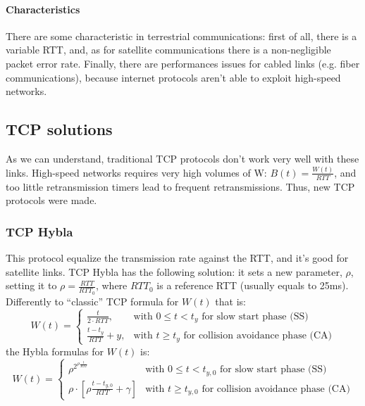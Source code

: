 \paragraph*{Characteristics} There are some characteristic in terrestrial
communications: first of all, there is a variable RTT, and, as for satellite
communications there is a non-negligible packet error rate. Finally, there are
performances issues for cabled links (e.g. fiber communications), because
internet protocols aren't able to exploit high-speed networks.

\subsection{TCP solutions}

As we can understand, traditional TCP protocols don't work very well with these
links. High-speed networks requires very high volumes of W:
$B(t) = \frac{W(t)}{RTT}$, and too little retransmission timers lead to frequent
retransmissions. Thus, new TCP protocols were made.

\subsubsection{TCP Hybla}
\label{prt:tcp:hybla}

This protocol equalize the transmission rate against the RTT, and it's good for
satellite links.
TCP Hybla has the following solution: it sets a new parameter, $\rho$, setting
it to $\rho = \frac{RTT}{RTT_0}$, where $RTT_0$ is a reference RTT (usually
equals to 25ms).
Differently to ``classic'' TCP formula for $W(t)$ that is:
\begin{equation*}
  W(t) = \begin{cases}
    \frac{t}{2 \cdot RTT}, & \mbox{with } 0 \le t < t_y \mbox{ for slow start phase (SS)} \\
    \frac{t - t_y}{RTT} + y, & \mbox{with } t \ge t_y \mbox{ for collision avoidance phase (CA)}
  \end{cases}
\end{equation*}
the Hybla formulas for $W(t)$ is:
\begin{equation}
  W(t) = \begin{cases}
    \rho^{2^{\rho \frac{t}{RTT}}} & \mbox{with } 0 \le t < t_{y,0} \mbox{ for slow start phase (SS)} \\
    \rho \cdot \left [\rho\frac{t - t_{y,0}}{RTT} + \gamma \right ] & \mbox{with } t \ge t_{y,0} \mbox{ for collision avoidance phase (CA)}
    \end{cases}
\end{equation}

